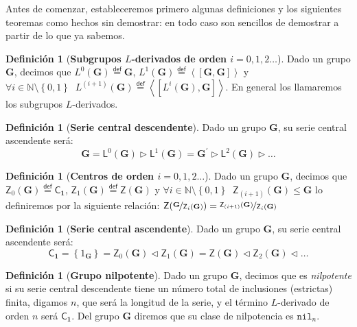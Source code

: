 \documentclass[final,12pt,a4paper,twoside,fleqn]{extbook}
\newcommand{\mathdef}{\ensuremath{\stackrel{\mathsf{def}}{{}={}}}}
\newcommand{\set}[1]{\ensuremath{\left\lbrace{#1}\right\rbrace}}
\newcommand{\setN}{\ensuremath{\mathds{N}}}
\newcommand{\grG}{\ensuremath{\mathbf{G}}}
\newcommand{\subgreq}{\ensuremath{\leqslant}}
\newcommand{\normsubgr}{\ensuremath{         \vartriangleleft         }}
\newcommand{\grclass}[1]{\ensuremath{\mathsf{#1}}}
\newcommand{\trivialgr}{\ensuremath{{\grclass{C}}_{\mathbf{1}}}}
\newcommand{\centro}[1]{\ensuremath{
        {\mathsf{Z}}
        {\left({#1}\right)}
}}
\theoremstyle{definition}
\newtheorem{defn}[thm]{Definici\'on}
\theoremstyle{remark}
\begin{document}
Antes de comenzar, estableceremos primero algunas definiciones y los siguientes teoremas
como hechos sin demostrar: en
todo caso son sencillos de demostrar a partir de lo que ya sabemos.
\par
\begin{defn}[\textbf{Subgrupos $L$-derivados de orden $i=0,1,2\ldots$}]
  \phantom{    }Dado un grupo $\grG$, decimos que ${L^0}{\left({\grG}\right)}\mathdef {\grG}$,
  ${L^1}{\left({\grG}\right)}\mathdef \left\langle\left[{\grG,\grG}\right]\right\rangle$ y
  $\forall i         \in \setN\setminus\set{0,1}\;\;{L^{(i+1)}}{\left({\grG}\right)}\mathdef
  \left\langle\left[{{L^i}(\grG),\grG}\right]\right\rangle$. En general los llamaremos
  los subgrupos $L$-derivados.
\end{defn}
\par
\begin{defn}[\textbf{Serie central descendente}]
  \phantom{    }Dado un grupo $\grG$, su serie central ascendente ser\'a:
  \[
  \grG = {\mathsf{L}^0}{\left({\grG}\right)} \triangleright {\mathsf{L}^1}{\left({\grG}\right)}={\grG}^{\prime}
  \triangleright {\mathsf{L}^2}{\left({\grG}\right)}\triangleright \ldots
  \]
\end{defn}
\par
\begin{defn}[\textbf{Centros de orden $i=0,1,2\ldots$}]
  \phantom{    }Dado un grupo $\grG$, decimos que ${\mathsf{Z}_0}{\left({\grG}\right)}\mathdef {\trivialgr}$,
  ${\mathsf{Z}_1}{\left({\grG}\right)}\mathdef \centro{\grG}$ y
  $\forall i         \in \setN\setminus\set{0,1}\;\;{\mathsf{Z}_{(i+1)}}{\left({\grG}\right)}\subgreq{\grG}$ lo definiremos por
  la siguiente relaci\'on: $\centro{\nicefrac{\grG}{{\mathsf{Z}_{i}}{\left({\grG}\right)}}}=
  \nicefrac{{\mathsf{Z}_{(i+1)}}{\left({\grG}\right)}}{{\mathsf{Z}_{i}}{\left({\grG}\right)}}$
\end{defn}
\par
\begin{defn}[\textbf{Serie central ascendente}]
  \phantom{    }Dado un grupo $\grG$, su serie central ascendente ser\'a:
  \[
  \trivialgr=\set{1_{\grG}}={\mathsf{Z}_0}{\left({\grG}\right)}
  \normsubgr {\mathsf{Z}_1}{\left({\grG}\right)}={\mathsf{Z}}{\left({\grG}\right)}
  \normsubgr {\mathsf{Z}_2}{\left({\grG}\right)}\normsubgr \ldots
  \]
\end{defn}
\par
\begin{defn}[\textbf{Grupo nilpotente}]
  \phantom{    }Dado un grupo $\grG$, decimos que es \emph{nilpotente} si su serie central
  descendente tiene un n\'umero total de inclusiones (estrictas) finita, digamos $n$, que ser\'a
  la longitud de la serie, y el t\'ermino $L$-derivado de orden $n$ ser\'a $\trivialgr$.
  Del grupo $\grG$ diremos que su clase de nilpotencia es $\mathtt{nil}_n$.
\end{defn}
\end{document}

